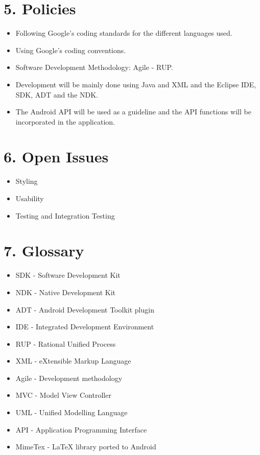 \documentclass[29pt,a4paper]{moderncv}
\begin{document}
	\section*{\textbf{5. Policies}}
	\vspace{4mm}
		\begin{itemize}
			\item Following Google’s coding standards for the different languages used.
			\item Using Google’s coding conventions.
			\item Software Development Methodology: Agile - RUP.
			\item Development will be mainly done using Java and XML and the Eclipse IDE, SDK, ADT and the NDK.
			\item The Android API will be used as a guideline and the API functions will be incorporated in the application.
			
		\end{itemize}	
	\vspace{5mm}
	
	\section*{\textbf{6. Open Issues}}
	\vspace{4mm}
		\begin{itemize}
			\item Styling
			\item Usability
			\item Testing and Integration Testing
			
		\end{itemize}
	\vspace{5mm}
	
	\section*{\textbf{7. Glossary}}
	\vspace{4mm}
		\begin{itemize}
			\item SDK - Software Development Kit
			\item NDK - Native Development Kit
			\item ADT - Android Development Toolkit plugin
			\item IDE - Integrated Development Environment
			\item RUP - Rational Unified Process
			\item XML - eXtensible Markup Language
			\item Agile - Development methodology
			\item MVC - Model View Controller
			\item UML - Unified Modelling Language
			\item API - Application Programming Interface
			\item MimeTex - LaTeX library ported to Android
			
		\end{itemize}
	\vspace{5mm}
\end{document}
